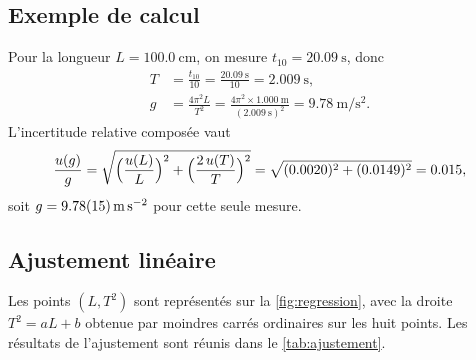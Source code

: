 \begin{resultats}
\subsection{Exemple de calcul}

Pour la longueur $L=\qty{100.0}{\centi\metre}$, on mesure
$t_{10}=\qty{20.09}{\second}$, donc
\begin{align}
  T   &= \frac{t_{10}}{10} = \frac{\qty{20.09}{\second}}{10} = \qty{2.009}{\second},
  \label{eq:calcT}\\
  g   &= \frac{4\pi^{2}L}{T^{2}}
       = \frac{4\pi^{2}\times\qty{1.000}{\metre}}{(\qty{2.009}{\second})^{2}}
       = \qty{9.78}{\metre\per\second\squared}.
  \label{eq:calcg}
\end{align}
L'incertitude relative composée vaut
\begin{equation}
  \frac{u\mathopen{}\left(g\right)}{g}=\sqrt{\Bigl(\frac{u(L)}{L}\Bigr)^{2}+\Bigl(\frac{2\,u(T)}{T}\Bigr)^{2}}
  =\sqrt{(\num{0.0020})^{2}+(\num{0.0149})^{2}}=\num{0.015},
  \label{eq:uponctuel}
\end{equation}
soit $g=\qty{9.78 +- 0.15}{\metre\per\second\squared}$ pour cette seule
mesure.

\subsection{Ajustement linéaire}

Les points $(L,T^{2})$ sont représentés sur la \cref{fig:regression}, avec la
droite $T^{2}=aL+b$ obtenue par moindres carrés ordinaires sur les huit
points. Les résultats de l'ajustement sont réunis dans le \cref{tab:ajustement}.


\end{resultats}
